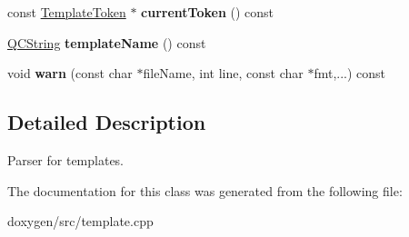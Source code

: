 \begin{DoxyCompactItemize}
\item 
\mbox{\label{class_template_parser_a66dc5fcf5c879960fb540dcb7385f6c6}} 
const \mbox{\hyperlink{class_template_token}{Template\+Token}} $\ast$ {\bfseries current\+Token} () const
\item 
\mbox{\label{class_template_parser_a5d031c606dc45d7786c1e2239490d5cb}} 
\mbox{\hyperlink{class_q_c_string}{Q\+C\+String}} {\bfseries template\+Name} () const
\item 
\mbox{\label{class_template_parser_ae19af6cb0602c3031b39416c3787c02f}} 
void {\bfseries warn} (const char $\ast$file\+Name, int line, const char $\ast$fmt,...) const
\end{DoxyCompactItemize}


\subsection{Detailed Description}
Parser for templates. 

The documentation for this class was generated from the following file\+:\begin{DoxyCompactItemize}
\item 
doxygen/src/template.\+cpp\end{DoxyCompactItemize}
